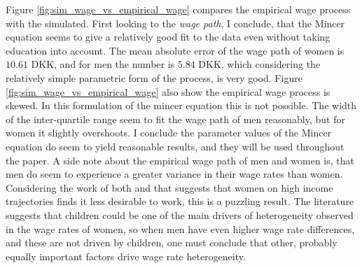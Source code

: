 Figure \ref{fig:sim_wage_vs_empirical_wage} compares the empirical wage process with the simulated. First looking to the \textit{wage path}, I conclude, that the Mincer equation seems to give a relatively good fit to the data even without taking education into account. The mean absolute error of the wage path of women is $10.61$ DKK, and for men the number is $5.84$ DKK, which considering the relatively simple parametric form of the process, is very good. Figure \ref{fig:sim_wage_vs_empirical_wage} also  show the empirical wage process is skewed. In this formulation of the mincer equation this is not possible. The width of the inter-quartile range seem to fit the wage path of men reasonably, but for women it slightly overshoots. I conclude the parameter values of the Mincer equation do seem to yield reasonable results, and they will be used throughout the paper. A side note about the empirical wage path of men and women is, that men do seem to experience a greater variance in their wage rates than women. Considering the work of both \textcite{francesconi_joint_2002} and \textcite{gayle_life-cyle_2006} that suggests that women on high income trajectories finds it less desirable to work, this is a puzzling result. The literature suggests that children could be one of the main drivers of heterogeneity observed in the wage rates of women, so when men have even higher wage rate differences, and these are not driven by children, one must conclude that other, probably equally important factors drive wage rate heterogeneity.


